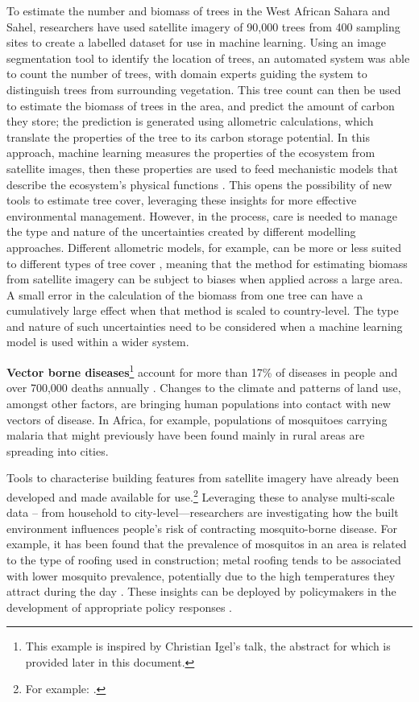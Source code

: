 To estimate the number and biomass of trees in the West African Sahara
and Sahel, researchers have used satellite imagery of 90,000 trees from
400 sampling sites to create a labelled dataset for use in machine
learning. Using an image segmentation tool to identify the location of
trees, an automated system was able to count the number of trees, with
domain experts guiding the system to distinguish trees from surrounding
vegetation. This tree count can then be used to estimate the biomass of
trees in the area, and predict the amount of carbon they store; the
prediction is generated using allometric calculations, which translate
the properties of the tree to its carbon storage potential. In this
approach, machine learning measures the properties of the ecosystem from
satellite images, then these properties are used to feed mechanistic
models that describe the ecosystem's physical functions \cite{Brandt-trees20}. This opens the
possibility of new tools to estimate tree cover, leveraging these
insights for more effective environmental management. However, in the
process, care is needed to manage the type and nature of the
uncertainties created by different modelling approaches. Different
allometric models, for example, can be more or less suited to different
types of tree cover \cite{Hiernaux-allometric23},
meaning that the method for estimating biomass from satellite imagery
can be subject to biases when applied across a large area. A small error
in the calculation of the biomass from one tree can have a cumulatively
large effect when that method is scaled to country-level. The type and
nature of such uncertainties need to be considered when a machine
learning model is used within a wider system.

\noindent\textbf{Vector borne diseases}\footnote{This example is inspired by
  Christian Igel's talk, the abstract for which is provided later in
  this document.} account for more than 17\% of diseases in people and
over 700,000 deaths annually \cite{Hernandez-taking22}.
Changes to the climate and patterns of land use, amongst other factors,
are bringing human populations into contact with new vectors of disease.
In Africa, for example, populations of mosquitoes carrying malaria that
might previously have been found mainly in rural areas are spreading
into cities.

Tools to characterise building features from satellite imagery have
already been developed and made available for use.\footnote{For example: \cite{Quinn-mapping21}.} Leveraging these to analyse multi-scale data -- from household to
city-level---researchers are investigating how the built environment
influences people's risk of contracting mosquito-borne disease. For
example, it has been found that the prevalence of mosquitos in an area
is related to the type of roofing used in construction; metal roofing
tends to be associated with lower mosquito prevalence, potentially due
to the high temperatures they attract during the day \cite{Lindsay-reduced19}.
These insights can be deployed by policymakers in the development of
appropriate policy responses \cite{RDA-combat22}.

